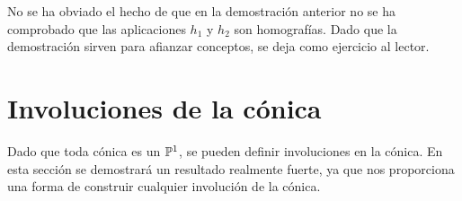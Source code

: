 \begin{obs}
	No se ha obviado el hecho de que en la demostración anterior no se ha comprobado que las aplicaciones $h_1$ y $h_2$ son homografías. Dado que la demostración sirven para afianzar conceptos, se deja como ejercicio al lector.
\end{obs}

\section{Involuciones de la cónica}

Dado que toda cónica es un $\mathbb{P}^1$, se pueden definir involuciones en la cónica. En esta sección se demostrará un resultado realmente fuerte, ya que nos proporciona una forma de construir cualquier involución de la cónica.


